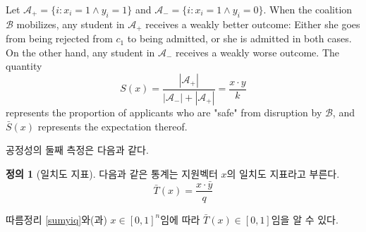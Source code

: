 \documentclass[12pt]{article} %
\newif\ifEN
\theoremstyle{definition}
\newtheorem{definition}{Definition}
\theoremstyle{definition}
\newtheorem{definition}{정의}
\begin{document}
{Let $\mathcal{A}_+ = \{i: x_i = 1 \wedge y_i=1\}$ and $\mathcal{A}_- =  \{i: x_i = 1 \wedge y_i=0\}$. When the coalition $\mathcal{B}$ mobilizes, any student in $\mathcal{A}_+$ receives a weakly better outcome: Either she goes from being rejected from $c_1$ to being admitted, or she is admitted in both cases. On the other hand, any student in $\mathcal{A}_-$ receives a weakly worse outcome. The quantity 
\begin{equation}
S(x) = \frac{|\mathcal{A}_+|}{|\mathcal{A}_-| + |\mathcal{A}_+|} =\frac{x \cdot y}{k}
\end{equation}
represents the proportion of applicants who are "safe" from disruption by $\mathcal{B}$, and $\bar S(x)$ represents the expectation thereof. 
}  \fi

\ifEN{
The second measure of fairness is as follows. 
\begin{definition}[Alignment index]
The statistic \begin{equation} \bar T(x) = \frac{x \cdot \bar y}{q}\end{equation} is called the \emph{alignment index} of the application vector $x$.
\end{definition}
By Corollary \ref{sumyiq} and the fact that $x \in [0, 1]^n$, we have $\bar T(x) \in [0, 1]$. 
} \else {
공정성의 둘째 측정은 다음과 같다.
\begin{definition}[일치도 지표]
다음과 같은 통계는 지원벡터 $x$의 일치도 지표라고 부른다. \begin{equation} \bar T(x) = \frac{x \cdot \bar y}{q}\end{equation}\end{definition}
따름정리 \ref{sumyiq}와(과) $x \in [0, 1]^n$임에 따라 $\bar T(x) \in [0, 1]$임을 알 수 있다.
} \fi
\end{document}
